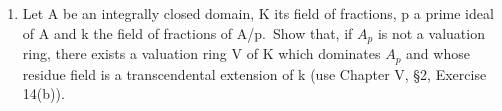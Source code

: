 \begin{enumerate}
\def\labelenumi{\arabic{enumi}.}
\setcounter{enumi}{5}
\tightlist
\item
  Let A be an integrally closed domain, K its field of fractions, p a prime ideal of A and k the field of fractions of A/p.~Show that, if \(A_{p}\) is not a valuation ring, there exists a valuation ring V of K which dominates \(A_{p}\) and whose residue field is a transcendental extension of k (use Chapter V, §2, Exercise 14(b)).
\end{enumerate}

